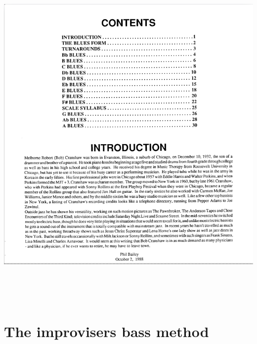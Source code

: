 \documentclass[a4paper]{book}
\begin{document}
\begin{center}
\includegraphics[width=17cm,height=17.699cm]{lebluessupportsmethodes-img146.png}
\end{center}
\clearpage\section{The improviser{\textquotesingle}s bass method}
\end{document}
